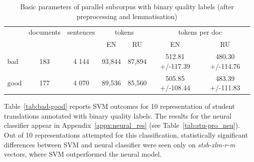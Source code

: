 \begin{table}[]
	\centering
	\begin{tabular}{l|c|c|cc|cc}
		\toprule
		       & documents & sentences & \multicolumn{2}{c|}{tokens} & \multicolumn{2}{c}{tokens per doc} \\
		       &           &           & EN      &  RU              & EN      &  RU \\
		\midrule  
		bad     & 183  	   & 4 144    & 93,844 & 87,894           & 512.81 +/-117.39 & 480.30 +/-114.76 \\  
		good    & 177      & 4 070    & 89,536 & 85,560           & 505.85 +/-108.44 & 483.39 +/-111.83 \\ 
		\bottomrule
	\end{tabular}
	\caption{\label{tab:binqua_pars} Basic parameters of parallel subcorpus with binary quality labels (after preprocessing and lemmatisation)}
\end{table}

Table~\ref{tab:bad-good} reports SVM outcomes for 10 representation of student translations annotated with binary quality labels. The results for the neural classifier appear in Appendix~\ref{appx:neural_res} (see Table~\ref{tab:stu-pro_neu}). 
Out of 10 representations attempted for this classification, statistically significant differences between SVM and neural classifier were seen only on \textit{stsb-xlm-r-m} vectors, where SVM outperformed the neural model. 

